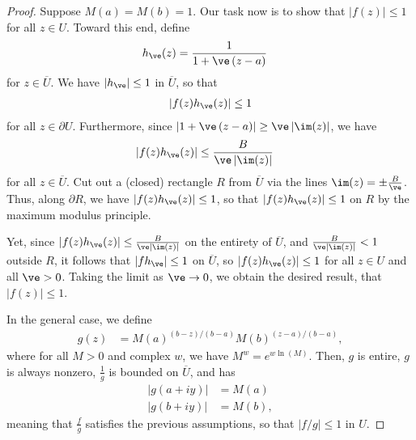 \documentclass[10pt]{mypackage}
\begin{document}
\begin{proof}
  Suppose $M(a) = M(b) = 1$. Our task now is to show that $\left\vert f(z) \right\vert \leq 1$ for all $z\in U$. Toward this end, define
  \begin{align*}
    h_{\ve}(z) &= \frac{1}{1 + \ve\left( z-a \right)}
  \end{align*}
  for $z\in \overline{U}$. We have $\left\vert h_{\ve} \right\vert \leq 1$ in $ \overline{U} $, so that
  \begin{align*}
    \left\vert f(z)h_{\ve}(z) \right\vert \leq 1
  \end{align*}
  for all $z\in \partial U$. Furthermore, since $\left\vert 1 + \ve\left( z-a \right) \right\vert \geq \ve\left\vert \im(z) \right\vert$, we have
  \begin{align*}
    \left\vert f(z)h_{\ve}(z) \right\vert &\leq \frac{B}{\ve\left\vert \im(z) \right\vert}
  \end{align*}
  for all $z\in \overline{U}$. Cut out a (closed) rectangle $R$ from $ \overline{U} $ via the lines $\im(z) = \pm \frac{B}{\ve}$. Thus, along $\partial R$, we have $\left\vert f(z)h_{\ve}(z) \right\vert \leq 1$, so that $\left\vert f(z)h_{\ve}(z) \right\vert \leq 1$ on $R$ by the maximum modulus principle.\newline

  Yet, since $\left\vert f(z)h_{\ve}(z) \right\vert \leq \frac{B}{\ve\left\vert \im(z) \right\vert}$ on the entirety of $ \overline{U} $, and $ \frac{B}{\ve\left\vert \im(z) \right\vert} < 1 $ outside $R$, it follows that $\left\vert fh_{\ve} \right\vert\leq 1$ on $ \overline{U} $, so $ \left\vert f(z)h_{\ve}(z) \right\vert \leq 1 $ for all $z\in U$ and all $\ve > 0$. Taking the limit as $\ve \rightarrow 0$, we obtain the desired result, that $\left\vert f(z) \right\vert \leq 1$.\newline

  In the general case, we define
  \begin{align*}
    g(z) &= M(a)^{(b-z)/(b-a)}M(b)^{(z-a)/(b-a)},
  \end{align*}
  where for all $M > 0$ and complex $w$, we have $M^{w} = e^{w\ln(M)}$. Then, $g$ is entire, $g$ is always nonzero, $\frac{1}{g}$ is bounded on $ \overline{U} $, and has
  \begin{align*}
    \left\vert g\left( a + iy \right) \right\vert &= M(a)\\
    \left\vert g\left( b + iy \right) \right\vert &= M(b),
  \end{align*}
  meaning that $\frac{f}{g}$ satisfies the previous assumptions, so that $ \left\vert f/g \right\vert \leq 1 $ in $U$.
\end{proof}
\end{document}
